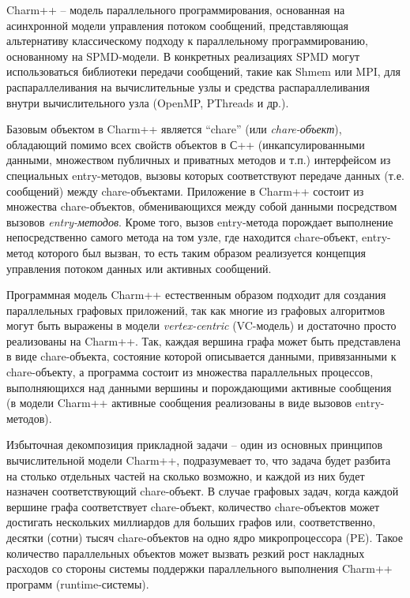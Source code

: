 \documentclass[11pt, oneside, a4paper]{article}
\begin{document}
Charm++ -- модель параллельного программирования, основанная на асинхронной модели управления потоком сообщений, представляющая
альтернативу классическому подходу к параллельному программированию, основанному на SPMD-модели. В конкретных реализациях SPMD могут 
использоваться библиотеки передачи сообщений, такие как Shmem или MPI, для распараллеливания на вычислительные узлы и средства 
распараллеливания внутри вычислительного узла (OpenMP, PThreads и др.). 

Базовым объектом в Charm++ является ``chare'' (или \textit{chare-объект}), обладающий помимо всех свойств объектов в С++ (инкапсулированными данными, 
множеством публичных и приватных методов и т.п.) интерфейсом из специальных entry-методов, вызовы которых соответствуют передаче данных 
(т.е. сообщений) между chare-объектами.  Приложение в Charm++ состоит из множества chare-объектов, обменивающихся между собой данными 
посредством вызовов \textit{entry-методов}. Кроме того, вызов entry-метода порождает выполнение непосредственно самого метода на том узле, где 
находится chare-объект, entry-метод которого был вызван, то есть таким образом реализуется концепция управления потоком данных или 
активных сообщений. 

Программная модель Charm++ естественным образом подходит для создания параллельных графовых приложений, так как многие из
графовых алгоритмов могут быть выражены в модели \textit{vertex-centric} \cite{McCune:2015:TLV:2830539.2818185} (VC-модель) и достаточно 
просто реализованы на Charm++. Так, каждая
вершина графа может быть представлена в виде chare-объекта, состояние которой описывается данными, привязанными к chare-объекту, а
программа состоит из множества параллельных процессов, выполняющихся над данными вершины и порождающими активные сообщения 
(в модели Charm++ активные сообщения реализованы в виде вызовов entry-методов).

Избыточная декомпозиция прикладной задачи -- один из основных принципов вычислительной модели Charm++, подразумевает то, что
задача будет разбита на столько отдельных частей на сколько возможно, и каждой из них будет назначен соответствующий chare-объект.
В случае графовых задач, когда каждой вершине графа соответствует chare-объект, количество chare-объектов может достигать 
нескольких миллиардов для больших графов или, соответственно, десятки (сотни) тысяч chare-объектов на одно ядро микропроцессора (PE). Такое
количество параллельных объектов может вызвать резкий рост накладных расходов со стороны системы поддержки параллельного 
выполнения Charm++ программ (runtime-системы). 
\end{document}
